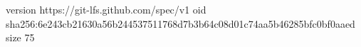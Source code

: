version https://git-lfs.github.com/spec/v1
oid sha256:6e243cb21630a56b244537511768d7b3b64c08d01c74aa5b46285bfc0bf0aaed
size 75

